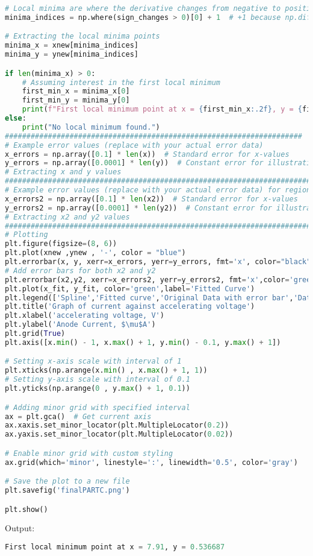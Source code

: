 \documentclass[a4paper,11pt]{article}
\begin{document}
\begin{lstlisting}[language=Python]
# Local minima are where the derivative changes from negative to positive, i.e., sign change is positive
minima_indices = np.where(sign_changes > 0)[0] + 1  # +1 because np.diff shifts indices by 1

# Extracting the local minima points
minima_x = xnew[minima_indices]
minima_y = ynew[minima_indices]

if len(minima_x) > 0:
    # Assuming interest in the first local minimum
    first_min_x = minima_x[0]
    first_min_y = minima_y[0]
    print(f"First local minimum point at x = {first_min_x:.2f}, y = {first_min_y:.6f}")
else:
    print("No local minimum found.")
#####################################################################
# Example error values (replace with your actual error data)
x_errors = np.array([0.1] * len(x))  # Standard error for x-values
y_errors = np.array([0.0001] * len(y))  # Constant error for illustration
# Extracting x and y values
############################################################################
# Example error values (replace with your actual error data) for region of interest
x_errors2 = np.array([0.1] * len(x2))  # Standard error for x-values
y_errors2 = np.array([0.0001] * len(y2))  # Constant error for illustration
# Extracting x2 and y2 values
############################################################################
# Plotting
plt.figure(figsize=(8, 6))
plt.plot(xnew ,ynew , '-', color = "blue")
plt.errorbar(x, y, xerr=x_errors, yerr=y_errors, fmt='x', color="black", ecolor='red', elinewidth=2, capsize=6, label='Original Data with Error Bars')  # Add error bars for both x and y
# Add error bars for both x2 and y2 
plt.errorbar(x2,y2, xerr=x_errors2, yerr=y_errors2, fmt='x',color='green',ecolor='orange',elinewidth=2, capsize=4)
plt.plot(x_fit, y_fit, color='green',label='Fitted Curve')
plt.legend(['Spline','Fitted curve','Original Data with error bar','Data of region of interest with error bar'])
plt.title('Graph of current against accelerating voltage')
plt.xlabel('accelerating voltage, V')
plt.ylabel('Anode Current, $\mu$A')
plt.grid(True)
plt.axis([x.min() - 1, x.max() + 1, y.min() - 0.1, y.max() + 1])

# Setting x-axis scale with interval of 1
plt.xticks(np.arange(x.min() , x.max() + 1, 1))
# Setting y-axis scale with interval of 0.1
plt.yticks(np.arange(0 , y.max() + 1, 0.1))

# Adding minor grid with specified interval
ax = plt.gca()  # Get current axis
ax.xaxis.set_minor_locator(plt.MultipleLocator(0.2))
ax.yaxis.set_minor_locator(plt.MultipleLocator(0.02))

# Enable minor grid with custom styling
ax.grid(which='minor', linestyle=':', linewidth='0.5', color='gray')

# Save the plot to a new file
plt.savefig('finalPARTC.png')

plt.show()
\end{lstlisting}
Output:
\begin{lstlisting}[language=Python]
First local minimum point at x = 7.91, y = 0.536687
\end{lstlisting}
\newpage
\end{document}
